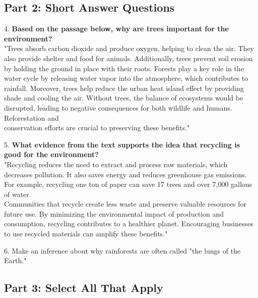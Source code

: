 \documentclass[12pt]{article}
\begin{document}
\vspace{1cm}
\newpage

\subsection*{Part 2: Short Answer Questions}

4. \textbf{Based on the passage below, why are trees important for the environment?\\}
"Trees absorb carbon dioxide and produce oxygen, helping to clean the air. They also provide shelter and food for animals. Additionally, trees prevent soil erosion by holding the ground in place with their roots. Forests play a key role in the water cycle by releasing water vapor into the atmosphere, which contributes to rainfall. Moreover, trees help reduce the urban heat island effect by providing shade and cooling the air. Without trees, the balance of ecosystems would be disrupted, leading to negative consequences for both wildlife and humans. Reforestation and \\conservation efforts are crucial to preserving these benefits."\\
\vspace{4cm}

5. \textbf{What evidence from the text supports the idea that recycling is good for the environment?\\}
"Recycling reduces the need to extract and process raw materials, which decreases pollution. It also saves energy and reduces greenhouse gas emissions. For example, recycling one ton of paper can save 17 trees and over 7,000 gallons of water. \\Communities that recycle create less waste and preserve valuable resources for future use. By minimizing the environmental impact of production and consumption, recycling contributes to a healthier planet. Encouraging businesses to use recycled materials can amplify these benefits."\\
\vspace{4cm}

6. Make an inference about why rainforests are often called "the lungs of the Earth."\\
\vspace{4cm}

\subsection*{Part 3: Select All That Apply}
\end{document}
